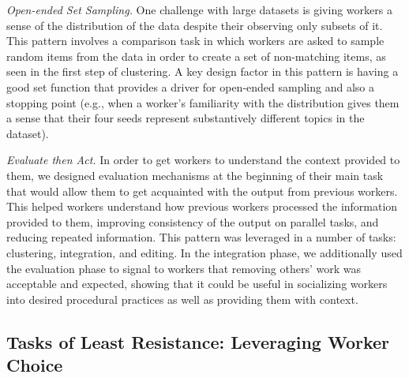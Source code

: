 
\textit{Open-ended Set Sampling.} One challenge with large datasets is giving workers a sense of the distribution of the data despite their observing only subsets of it. This pattern involves a comparison task in which workers are asked to sample random items from the data in order to create a set of non-matching items, as seen in the first step of clustering. A key design factor in this pattern is having a good set function that provides a driver for open-ended sampling and also a stopping point (e.g., when a worker's familiarity with the distribution gives them a sense that their four seeds represent substantively different topics in the dataset).


\textit{Evaluate then Act.} In order to get workers to understand
the context provided to them, we designed evaluation mechanisms
at the beginning of their main task that would allow
them to get acquainted with the output from previous workers.
This helped workers understand how previous workers
processed the information provided to them, improving consistency
of the output on parallel tasks, and reducing repeated
information. This pattern was leveraged in a number of tasks: clustering, integration, and editing. In the integration phase, we
additionally used the evaluation phase to signal to workers that removing others' work was acceptable and expected, showing that it could be useful in socializing workers into desired procedural practices as well as providing them with context.

\subsection{Tasks of Least Resistance: Leveraging Worker Choice}

